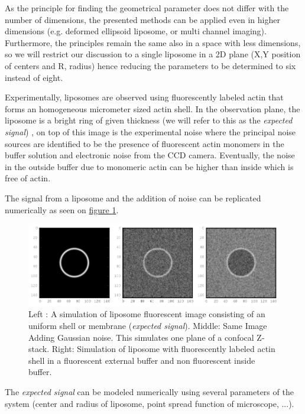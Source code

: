 \documentclass[A4paperpaper,11pt,english]{sphinxmanual}
\begin{document}
As the principle for finding the geometrical parameter does not differ with the
number of dimensions, the presented methods can be applied even in higher dimensions (e.g. deformed
ellipsoid liposome, or multi channel imaging). Furthermore, the principles remain the same also in a
space with less dimensions, so we will restrict our discussion to a single liposome
in a 2D plane (X,Y position of centers and R, radius) hence reducing the parameters to be determined to six instead of eight.

Experimentally, liposomes are observed using fluorescently labeled actin that
forms an homogeneous micrometer sized actin shell. In the observation plane,
the liposome is a bright ring of given thickness (we will refer to this as the
\emph{expected signal}) , on top of this image is the experimental noise where the
principal noise sources are identified to be the presence of fluorescent actin monomers in the
buffer solution and electronic noise from the CCD camera. Eventually, the noise
in the outside buffer due to monomeric actin can be higher than inside which is
free of actin.

The signal from a liposome and the addition of noise can be replicated
numerically as seen on  \hyperref[index-latex:fig-2d-sim]{figure  \ref*{index-latex:fig-2d-sim}}.
\begin{figure}[htbp]
\centering
\capstart

\includegraphics{modl-2D-doublet.png}
\caption{Left : A simulation of liposome fluorescent image consisting of an uniform shell or membrane
(\emph{expected signal}).  Middle: Same Image Adding Gaussian noise. This simulates
one plane of a confocal Z-stack.  Right: Simulation of liposome with
fluorescently labeled actin shell in a fluorescent external buffer and non
fluorescent inside buffer.}\label{index-latex:fig-2d-sim}\end{figure}

The \emph{expected signal} can be modeled numerically using several parameters of
the system (center and radius of liposome, point spread function of microscope,
...).
\end{document}
